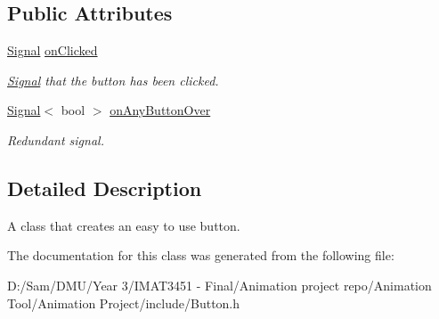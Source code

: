 \subsection*{Public Attributes}
\begin{DoxyCompactItemize}
\item 
\mbox{\label{class_button_afb6f1c9a85ffe02859e54b71c2bb372b}} 
\hyperlink{class_signal}{Signal} \hyperlink{class_button_afb6f1c9a85ffe02859e54b71c2bb372b}{on\+Clicked}
\begin{DoxyCompactList}\small\item\em \hyperlink{class_signal}{Signal} that the button has been clicked. \end{DoxyCompactList}\item 
\mbox{\label{class_button_a9ba6e57a49de78557823cc4a775e7030}} 
\hyperlink{class_signal}{Signal}$<$ bool $>$ \hyperlink{class_button_a9ba6e57a49de78557823cc4a775e7030}{on\+Any\+Button\+Over}
\begin{DoxyCompactList}\small\item\em Redundant signal. \end{DoxyCompactList}\end{DoxyCompactItemize}


\subsection{Detailed Description}
A class that creates an easy to use button. 

The documentation for this class was generated from the following file\+:\begin{DoxyCompactItemize}
\item 
D\+:/\+Sam/\+D\+M\+U/\+Year 3/\+I\+M\+A\+T3451 -\/ Final/\+Animation project repo/\+Animation Tool/\+Animation Project/include/Button.\+h\end{DoxyCompactItemize}
